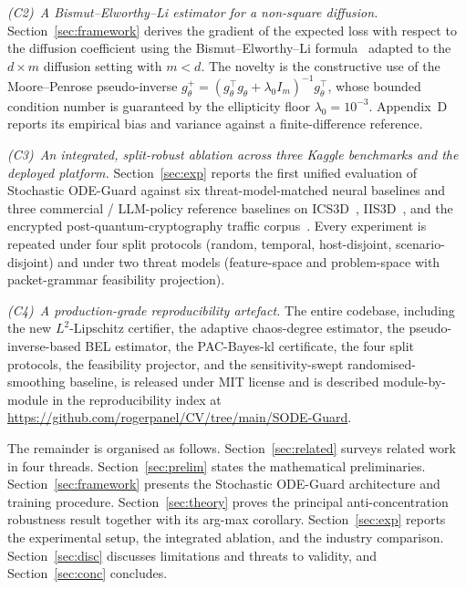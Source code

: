 \documentclass{ieeeaccess}
\newcommand{\pinv}{{+}}   %
\begin{document}
\emph{(C2)~A Bismut--Elworthy--Li estimator for a non-square diffusion.}
Section~\ref{sec:framework} derives the gradient of the expected loss
with respect to the diffusion coefficient using the Bismut--Elworthy--Li
formula~\cite{bismut1981martingales,elworthy1994formulae,hsu2002}
adapted to the $d\times m$ diffusion setting with $m<d$. The novelty is
the constructive use of the Moore--Penrose pseudo-inverse
$g_\theta^{\pinv} = (g_\theta^\top g_\theta + \lambda_0 I_m)^{-1}
g_\theta^\top$, whose bounded condition number is guaranteed by the
ellipticity floor $\lambda_0 = 10^{-3}$. Appendix~D reports its
empirical bias and variance against a finite-difference reference.

\emph{(C3)~An integrated, split-robust ablation across three Kaggle
benchmarks and the deployed platform.} Section~\ref{sec:exp} reports
the first unified evaluation of Stochastic ODE-Guard against six
threat-model-matched neural baselines and three commercial /
LLM-policy reference baselines on ICS3D~\cite{ds_ics3d},
IIS3D~\cite{ds_iis3d}, and the encrypted post-quantum-cryptography
traffic corpus~\cite{ds_pqcids}. Every experiment is repeated under
four split protocols (random, temporal, host-disjoint,
scenario-disjoint) and under two threat models (feature-space and
problem-space with packet-grammar feasibility projection).

\emph{(C4)~A production-grade reproducibility artefact.} The entire
codebase, including the new $L^{2}$-Lipschitz certifier, the adaptive
chaos-degree estimator, the pseudo-inverse-based BEL estimator, the
PAC-Bayes-kl certificate, the four split protocols, the feasibility
projector, and the sensitivity-swept randomised-smoothing baseline, is
released under MIT license and is described module-by-module in the
reproducibility index at
\url{https://github.com/rogerpanel/CV/tree/main/SODE-Guard}.

The remainder is organised as follows. Section~\ref{sec:related}
surveys related work in four threads. Section~\ref{sec:prelim} states
the mathematical preliminaries. Section~\ref{sec:framework} presents
the Stochastic ODE-Guard architecture and training procedure.
Section~\ref{sec:theory} proves the principal anti-concentration
robustness result together with its arg-max corollary.
Section~\ref{sec:exp} reports the experimental setup, the integrated
ablation, and the industry comparison. Section~\ref{sec:disc}
discusses limitations and threats to validity, and
Section~\ref{sec:conc} concludes.
\end{document}
